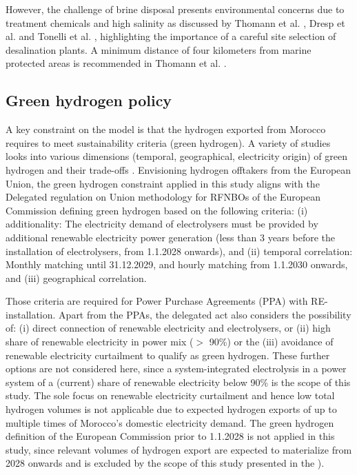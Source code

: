 However, the challenge of brine disposal presents environmental concerns due to treatment chemicals and high salinity as discussed by Thomann et al. \cite{Thomann2022}, Dresp et al. \cite{Dresp2019} and Tonelli et al. \cite{Tonelli2023}, highlighting the importance of a careful site selection of desalination plants. A minimum distance of four kilometers from marine protected areas is recommended in Thomann et al. \cite{Thomann2022}.



\subsection*{Green hydrogen policy}
\label{subsec:green_hydrogen_constraint}


A key constraint on the model is that the hydrogen exported from Morocco requires to meet sustainability criteria (green hydrogen). A variety of studies looks into various dimensions (temporal, geographical, electricity origin) of green hydrogen and their trade-offs \cite{Brauer2022, Ruhnau2023, Zeyen2024}.
Envisioning hydrogen offtakers from the European Union, the green hydrogen constraint applied in this study aligns with the Delegated regulation on Union methodology for RFNBOs of the European Commission \cite{Commission2023} defining green hydrogen based on the following criteria:
(i) additionality: The electricity demand of electrolysers must be provided by additional renewable electricity power generation (less than 3 years before the installation of electrolysers, from 1.1.2028 onwards), and
(ii) temporal correlation: Monthly matching until 31.12.2029, and hourly matching from 1.1.2030 onwards, and
(iii) geographical correlation.

Those criteria are required for Power Purchase Agreements (PPA) with RE-installation. Apart from the PPAs, the delegated act also considers the possibility of:
(i) direct connection of renewable electricity and electrolysers, or
(ii) high share of renewable electricity in power mix ($>$ 90\%) or the
(iii) avoidance of renewable electricity curtailment
to qualify as green hydrogen. These further options are not considered here, since a system-integrated electrolysis in a power system of a (current) share of renewable electricity below 90\% is the scope of this study. The sole focus on renewable electricity curtailment and hence low total hydrogen volumes is not applicable due to expected hydrogen exports of up to multiple times of Morocco's domestic electricity demand. The green hydrogen definition of the European Commission prior to 1.1.2028 is not applied in this study, since relevant volumes of hydrogen export are expected to materialize from 2028 onwards and is excluded by the scope of this study presented in the ).



